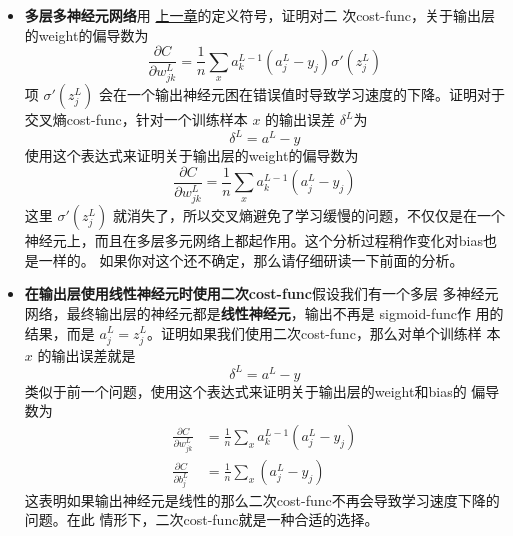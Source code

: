 \begin{itemize}
\item \textbf{多层多神经元网络}\quad 用%
  \hyperref[ch:HowTheBackpropagationAlgorithmWorks]{上一章}的定义符号，证明对二
  次\gls*{cost-func}，关于输出层的\gls*{weight}的偏导数为
  \begin{equation}
    \frac{\partial C}{\partial w^L_{jk}} = \frac{1}{n}
    \sum_x a^{L-1}_k  (a^L_j-y_j) \sigma'(z^L_j)
    \label{eq:65}\tag{65}
  \end{equation}
  项 $\sigma'(z^L_j)$ 会在一个输出神经元困在错误值时导致学习速度的下降。证明对于
  交叉熵\gls*{cost-func}，针对一个训练样本 $x$ 的输出误差 $\delta^L$为
  \begin{equation}
    \delta^L = a^L-y
    \label{eq:66}\tag{66}
  \end{equation}
  使用这个表达式来证明关于输出层的\gls*{weight}的偏导数为
  \begin{equation}
    \frac{\partial C}{\partial w^L_{jk}} = \frac{1}{n} \sum_x
    a^{L-1}_k  (a^L_j-y_j)
    \label{eq:67}\tag{67}
  \end{equation}
  这里 $\sigma'(z^L_j)$ 就消失了，所以交叉熵避免了学习缓慢的问题，不仅仅是在一个
  神经元上，而且在多层多元网络上都起作用。这个分析过程稍作变化对\gls*{bias}也是一样的。
  如果你对这个还不确定，那么请仔细研读一下前面的分析。
\item \textbf{在输出层使用线性神经元时使用二次\gls*{cost-func}}\quad 假设我们有一个多层
  多神经元网络，最终输出层的神经元都是\textbf{线性神经元}，输出不再是 \gls*{sigmoid-func}作
  用的结果，而是 $a^L_j = z^L_j$。证明如果我们使用二次\gls*{cost-func}，那么对单个训练样
  本 $x$ 的输出误差就是
  \begin{equation}
    \delta^L = a^L-y
    \label{eq:68}\tag{68}
  \end{equation}
  类似于前一个问题，使用这个表达式来证明关于输出层的\gls*{weight}和\gls*{bias}的
  偏导数为
  \begin{align}
    \frac{\partial C}{\partial w^L_{jk}} &= \frac{1}{n} \sum_x
                                           a^{L-1}_k  (a^L_j-y_j) \label{eq:69}\tag{69}\\
    \frac{\partial C}{\partial b^L_{j}} &= \frac{1}{n} \sum_x
                                          (a^L_j-y_j) \label{eq:70}\tag{70}
  \end{align}
  这表明如果输出神经元是线性的那么二次\gls*{cost-func}不再会导致学习速度下降的问题。在此
  情形下，二次\gls*{cost-func}就是一种合适的选择。
\end{itemize}

